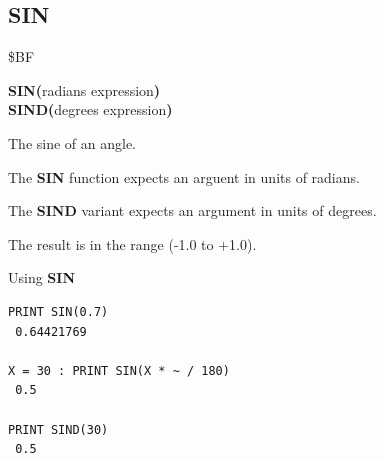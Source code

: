 \subsection{SIN}
\begin{description}[leftmargin=2cm,style=nextline]
\item [Token:]    \$BF

\item [Format:]   {\bf SIN(}radians expression{\bf )} \\
                  {\bf SIND(}degrees expression{\bf )}

\item [Returns:]  The sine of an angle.

                  The {\bf SIN} function expects an arguent in units of radians.

                  The {\bf SIND} variant expects an argument in units of degrees.

                  The result is in the range (-1.0 to +1.0).

\item [Examples:] Using {\bf SIN}

\begin{tcolorbox}[colback=black,coltext=white]
\verbatimfont{\codefont}
\begin{verbatim}
PRINT SIN(0.7)
 0.64421769

X = 30 : PRINT SIN(X * ~ / 180)
 0.5

PRINT SIND(30)
 0.5
\end{verbatim}
\end{tcolorbox}
\end{description}


\newpage
